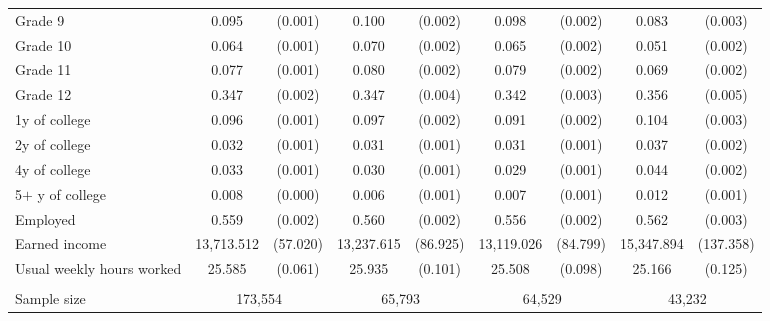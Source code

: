 \begin{tabular}{lcccccccc}
 \hspace{0.3cm} Grade 9   & 0.095 & (0.001)  & 0.100 & (0.002)  & 0.098 & (0.002)  & 0.083 & (0.003)  \\
 \hspace{0.3cm} Grade 10   & 0.064 & (0.001)  & 0.070 & (0.002)  & 0.065 & (0.002)  & 0.051 & (0.002)  \\
 \hspace{0.3cm} Grade 11   & 0.077 & (0.001)  & 0.080 & (0.002)  & 0.079 & (0.002)  & 0.069 & (0.002)  \\
 \hspace{0.3cm} Grade 12   & 0.347 & (0.002)  & 0.347 & (0.004)  & 0.342 & (0.003)  & 0.356 & (0.005)  \\
 \hspace{0.3cm} 1y of college   & 0.096 & (0.001)  & 0.097 & (0.002)  & 0.091 & (0.002)  & 0.104 & (0.003)  \\
 \hspace{0.3cm} 2y of college   & 0.032 & (0.001)  & 0.031 & (0.001)  & 0.031 & (0.001)  & 0.037 & (0.002)  \\
 \hspace{0.3cm} 4y of college   & 0.033 & (0.001)  & 0.030 & (0.001)  & 0.029 & (0.001)  & 0.044 & (0.002)  \\
 \hspace{0.3cm} 5$+$ y of college   & 0.008 & (0.000)  & 0.006 & (0.001)  & 0.007 & (0.001)  & 0.012 & (0.001)  \\
 Employed   & 0.559 & (0.002)  & 0.560 & (0.002)  & 0.556 & (0.002)  & 0.562 & (0.003)  \\
 Earned income   & 13,713.512 & (57.020)  & 13,237.615 & (86.925)  & 13,119.026 & (84.799)  & 15,347.894 & (137.358)  \\
 Usual weekly hours worked   & 25.585 & (0.061)  & 25.935 & (0.101)  & 25.508 & (0.098)  & 25.166 & (0.125)  \\
\\
Sample size & \multicolumn{2}{c}{173,554}  & \multicolumn{2}{c}{65,793}  & \multicolumn{2}{c}{64,529}  & \multicolumn{2}{c}{43,232}  \\
\bottomrule
\bottomrule
\end{tabular}